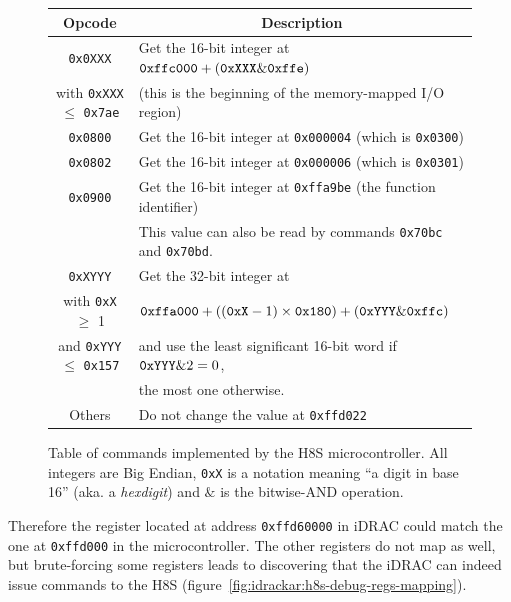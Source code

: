 \begin{figure}[ht]
  \centering
  \begin{tabular}{|c|l|}
    \hline
    \bf Opcode & \multicolumn{1}{c|}{\bf Description} \\
    \hline
    \texttt{0x0XXX} & Get the 16-bit integer at $\text{\texttt{0xffc000}} + (\text{\texttt{0xXXX}} \& \text{\texttt{0xffe}})$ \\
      with \texttt{0xXXX} $\leq$ \texttt{0x7ae} & (this is the beginning of the memory-mapped I/O region) \\
    \hline
    \texttt{0x0800} & Get the 16-bit integer at \texttt{0x000004} (which is \texttt{0x0300}) \\
    \hline
    \texttt{0x0802} & Get the 16-bit integer at \texttt{0x000006} (which is \texttt{0x0301}) \\
    \hline
    \texttt{0x0900} & Get the 16-bit integer at \texttt{0xffa9be} (the function identifier) \\
        & This value can also be read by commands \texttt{0x70bc} and \texttt{0x70bd}. \\
    \hline
    \texttt{0xXYYY} & Get the 32-bit integer at \\
      with \texttt{0xX} $\geq$ 1
        & $\text{\texttt{0xffa000}} + ((\text{\texttt{0xX}} - 1) \times \text{\texttt{0x180}}) + (\text{\texttt{0xYYY}} \& \text{\texttt{0xffc}})$ \\
      and \texttt{0xYYY} $\leq$ \texttt{0x157}
        & and use the least significant 16-bit word if $\text{\texttt{0xYYY}} \& 2 = 0$, \\
        & the most one otherwise. \\
    \hline
    Others & Do not change the value at \texttt{0xffd022} \\
    \hline
  \end{tabular}
  \caption{Table of commands implemented by the H8S microcontroller. All integers are Big Endian, \texttt{0xX} is a notation meaning ``a digit in base 16'' (aka. a \emph{hexdigit}) and $\&$ is the bitwise-AND operation.}
  \label{fig:idrackar:h8s-debug-cmds}
  \vspace*{-.3cm}
\end{figure}

Therefore the register located at address \texttt{0xffd60000} in iDRAC could match the one at \texttt{0xffd000} in the microcontroller.
The other registers do not map as well, but brute-forcing some registers leads to discovering that the iDRAC can indeed issue commands to the H8S (figure~\ref{fig:idrackar:h8s-debug-regs-mapping}).

